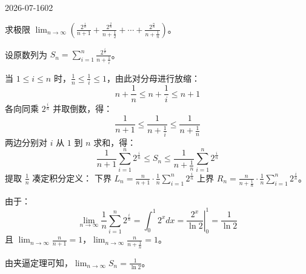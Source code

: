 \begin{mistake}{2026-07-16}{02}

\begin{problemcontent}
求极限 \(\lim_{n \to \infty} \left( \frac{2^{\frac{1}{n}}}{n+1} + \frac{2^{\frac{2}{n}}}{n+\frac{1}{2}} + \cdots + \frac{2^{\frac{n}{n}}}{n+\frac{1}{n}} \right)\)。
\end{problemcontent}

\begin{solutioncontent}
设原数列为 \(S_n = \sum_{i=1}^{n} \frac{2^{\frac{i}{n}}}{n+\frac{1}{i}}\)。

当 \(1 \le i \le n\) 时，\(\frac{1}{n} \le \frac{1}{i} \le 1\)，由此对分母进行放缩：
\[
n+\frac{1}{n} \le n+\frac{1}{i} \le n+1
\]
各向同乘 \(2^{\frac{i}{n}}\) 并取倒数，得：
\[
\frac{1}{n+1} \le \frac{1}{n+\frac{1}{i}} \le \frac{1}{n+\frac{1}{n}}
\]
两边分别对 \(i\) 从 \(1\) 到 \(n\) 求和，得：
\[
\frac{1}{n+1} \sum_{i=1}^{n} 2^{\frac{i}{n}} \le S_n \le \frac{1}{n+\frac{1}{n}} \sum_{i=1}^{n} 2^{\frac{i}{n}}
\]
提取 \(\frac{1}{n}\) 凑定积分定义：
下界 \(L_n = \frac{n}{n+1} \cdot \frac{1}{n} \sum_{i=1}^{n} 2^{\frac{i}{n}}\)
上界 \(R_n = \frac{n}{n+\frac{1}{n}} \cdot \frac{1}{n} \sum_{i=1}^{n} 2^{\frac{i}{n}}\)。

由于：
\[
\lim_{n \to \infty} \frac{1}{n} \sum_{i=1}^{n} 2^{\frac{i}{n}} = \int_{0}^{1} 2^x dx = \left. \frac{2^x}{\ln 2} \right|_{0}^{1} = \frac{1}{\ln 2}
\]
且 \(\lim_{n \to \infty} \frac{n}{n+1} = 1\)，\(\lim_{n \to \infty} \frac{n}{n+\frac{1}{n}} = 1\)。

由夹逼定理可知，\(\lim_{n \to \infty} S_n = \frac{1}{\ln 2}\)。
\end{solutioncontent}


\end{mistake}
